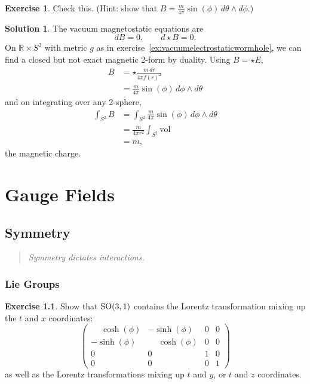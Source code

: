 \documentclass[11pt, a4paper]{report}
\theoremstyle{definition}
\newtheorem{ex}{Exercise}[part]
\newtheorem{sol}{Solution}[part]
\newenvironment{epigraph}
    {\begin{quote}\small\itshape} %
    {\end{quote}\ignorespacesafterend\vspace{\parskip}}
\newcommand*{\SO}{\ensuremath\text{SO}}
\begin{document}
\begin{ex}

Check this. (Hint: show that $B = \frac{m}{4 \pi} \sin(\phi) \, d\theta \wedge d\phi$.)

\end{ex}

\begin{sol}

The vacuum magnetostatic equations are
\[
    dB = 0, \qquad
    d \star B = 0.
\]
On $\mathbb{R} \times S^2$ with metric $g$ as in exercise~\ref{ex:vacuumelectrostaticwormhole}, we can find a closed but not exact magnetic 2-form by duality. Using $B = \star E$,
\begin{align*}
    B &= \star \frac{m \, dr}{4 \pi {f(r)}^2} \\
      &= \frac{m}{4 \pi} \sin(\phi) \, d\phi \wedge d\theta
\end{align*}
and on integrating over any 2-sphere,
\begin{align*}
    \int_{S^2} B &= \int_{S^2} \frac{m}{4 \pi} \sin(\phi) \, d\phi \wedge d\theta \\
        &= \frac{m}{4 \pi r^2} \int_{S^2} \text{vol} \\
        &= m,
\end{align*}
the magnetic charge.

\end{sol}

\part{Gauge Fields}

\chapter{Symmetry}

\begin{epigraph}
    Symmetry dictates interactions.
\end{epigraph}

\section{Lie Groups}

\begin{ex}

Show that $\SO(3, 1)$ contains the Lorentz transformation mixing up the $t$ and $x$ coordinates:
\[
    \begin{pmatrix}
        \phantom{-}\cosh(\phi) & -\sinh(\phi)           & 0 & 0 \\
        -\sinh(\phi)           & \phantom{-}\cosh(\phi) & 0 & 0 \\
        0                      & 0                      & 1 & 0 \\
        0                      & 0                      & 0 & 1
    \end{pmatrix}
\]
as well as the Lorentz transformations mixing up $t$ and $y$, or $t$ and $z$ coordinates.

\end{ex}
\end{document}
